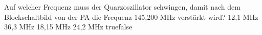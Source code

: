     {Auf welcher Frequenz muss der Quarzoszillator schwingen, damit nach dem Blockschaltbild von der PA die Frequenz 145,200 MHz verstärkt wird?}
    {12,1 MHz}
    {36,3 MHz}
    {18,15 MHz}
    {24,2 MHz}
    {true}{false}